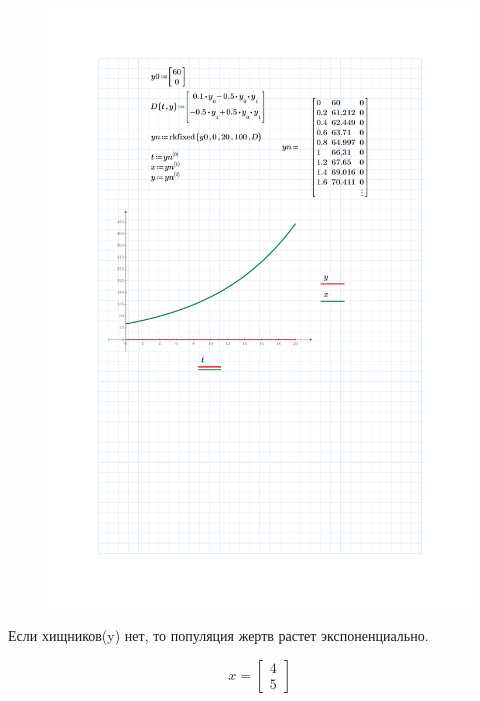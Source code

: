 \documentclass[a4paper, 14pt]{extarticle}
\begin{document}
		\begin{figure}[H]
			\centering
			\includegraphics[width = \linewidth]{2.pdf}
			\caption[.] {}
		\end{figure}
		Если хищников(y) нет, то популяция жертв растет экспоненциально. 
		\pagebreak
		
		\noindent \[ x = \begin{bmatrix}
			4 \\ 5
		\end{bmatrix} \]
	
\end{document}
